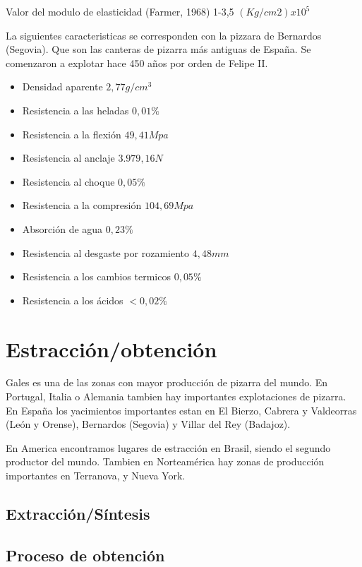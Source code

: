 Valor del modulo de elasticidad (Farmer, 1968) 1-3,5 $(Kg/cm2) x 10^5$
\par
La siguientes caracteristicas se corresponden con la pizzara de Bernardos (Segovia). Que son las canteras de pizarra más antiguas de España. Se comenzaron a explotar hace 450 años por orden de Felipe II.

 \begin{itemize}
        \item Densidad aparente $2,77 g/cm^3$ 
	\item Resistencia a las heladas $0,01\%$
	\item Resistencia a la flexión $49,41 Mpa$
	\item Resistencia al anclaje $3.979,16 N$
	\item Resistencia al choque $0,05\%$
	\item Resistencia a la compresión $104,69 Mpa$
	\item Absorción de agua $0,23\%$
	\item Resistencia al desgaste por rozamiento $4,48 mm$
	\item Resistencia a los cambios termicos $0,05\%$
	\item Resistencia a los ácidos $<0,02\%$
   \end{itemize}

\clearpage

\section {Estracción/obtención}
Gales es una de las zonas con mayor producción de pizarra del mundo. En Portugal, Italia o Alemania tambien hay importantes explotaciones de pizarra. En España los yacimientos importantes estan en El Bierzo, Cabrera y Valdeorras (León y Orense), Bernardos (Segovia) y Villar del Rey (Badajoz).

En America encontramos lugares de estracción en Brasil, siendo el segundo productor del mundo. Tambien en Norteamérica hay zonas de producción importantes en Terranova, y Nueva York.

	\subsection {Extracción/Síntesis}

	\subsection {Proceso de obtención}
